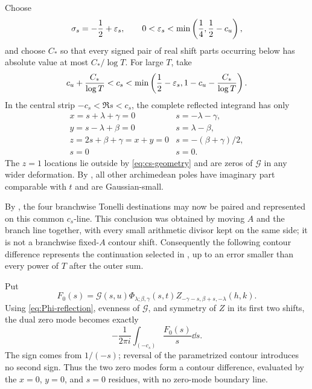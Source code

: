 Choose
\begin{equation}\label{eq:sigma-s}
 \sigma_s=-\frac12+\varepsilon_s,\qquad
 0<\varepsilon_s<\min\left(\frac14,\frac12-c_u\right),
\end{equation}
and choose $C_*$ so that every signed pair of real shift parts occurring
below has absolute value at most $C_*/\log T$.  For large $T$, take
\begin{equation}\label{eq:cs-geometry}
 c_u+\frac{C_*}{\log T}<c_s<
 \min\left(\frac12-\varepsilon_s,
            1-c_u-\frac{C_*}{\log T}\right).
\end{equation}
In the central strip $-c_s<\Re s<c_s$, the complete reflected integrand has
only
\begin{equation}\label{eq:central-divisors}
 \begin{array}{c|c}
 x=s+\lambda+\gamma=0&s=-\lambda-\gamma,\\
 y=s-\lambda+\beta=0&s=\lambda-\beta,\\
 z=2s+\beta+\gamma=x+y=0&s=-(\beta+\gamma)/2,\\
 s=0&s=0.
 \end{array}
\end{equation}
The $z=1$ locations lie outside by \eqref{eq:cs-geometry} and are zeros of
$\mathcal G$ in any wider deformation.  By , all
other archimedean poles have imaginary part comparable with $t$ and are
Gaussian-small.

By , the four branchwise Tonelli
destinations may now be paired and represented on this common $c_s$-line.
This conclusion was obtained by moving $A$ and the branch line together,
with every small arithmetic divisor kept on the same side; it is not a
branchwise fixed-$A$ contour shift.  Consequently the following contour
difference represents the continuation selected in
, up to
an error smaller than every power of $T$ after the outer sum.

Put
\begin{equation}\label{eq:F0}
 F_0(s)=\mathcal G(s,u)\Phi_{\lambda;\beta,\gamma}(s,t)
 Z_{-\gamma-s,\beta+s,-\lambda}(h,k).
\end{equation}
Using \eqref{eq:Phi-reflection}, evenness of $\mathcal G$, and symmetry of
$Z$ in its first two shifts, the dual zero mode becomes exactly
\begin{equation}\label{eq:zero-contour-difference}
                  -\frac{1}{2\pi i}\int_{(-c_s)}\frac{F_0(s)}s\dd s.
\end{equation}
The sign comes from $1/(-s)$; reversal of the parametrized contour introduces
no second sign.  Thus the two zero modes form a contour difference, evaluated
by the $x=0$, $y=0$, and $s=0$ residues, with no zero-mode boundary line.

